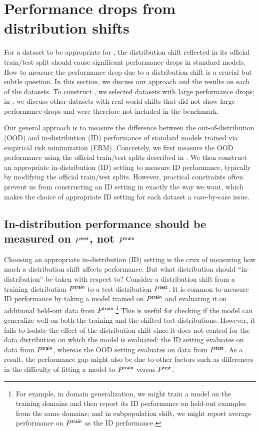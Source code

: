 \section{Performance drops from distribution shifts}\label{sec:erm_drops}

For a dataset to be appropriate for \Wilds, the distribution shift reflected in its official train/test split should cause significant performance drops in standard models.
How to measure the performance drop due to a distribution shift is a crucial but subtle question.
In this section, we discuss our approach and the results on each of the \Wilds datasets.
To construct \Wilds, we selected datasets with large performance drops;
in , we discuss other datasets with real-world shifts that did not show large performance drops and were therefore not included in the benchmark.

Our general approach is to measure the difference between the out-of-distribution (OOD) and in-distribution (ID) performance of standard models trained via empirical risk minimization (ERM).
Concretely, we first measure the OOD performance using the official train/test splits described in .
We then construct an appropriate in-distribution (ID) setting to measure ID performance, typically by modifying the official train/test splits.
However, practical constraints often prevent us from constructing an ID setting in exactly the way we want, which makes the choice of appropriate ID setting for each dataset a case-by-case issue.

\subsection{In-distribution performance should be measured on $P^\mathsf{test}$, not $P^\mathsf{train}$}
\label{sec:indist-control}
Choosing an appropriate in-distribution (ID) setting is the crux of measuring how much a distribution shift affects performance.
But what distribution should ``in-distribution'' be taken with respect to?
Consider a distribution shift from a training distribution $P^\mathsf{train}$ to a test distribution $P^\mathsf{test}$.
It is common to measure ID performance by taking a model trained on $P^\mathsf{train}$ and evaluating it on additional held-out data from $P^\mathsf{train}$.\footnote{For example, in domain generalization, we might train a model on the training domains and then report its ID performance on held-out examples from the same domains; and in subpopulation shift, we might report average performance on $P^\mathsf{train}$ as the ID performance.}
This is useful for checking if the model can generalize well on both the training and the shifted test distributions.
However, it fails to isolate the effect of the distribution shift since it does not control for the data distribution on which the model is evaluated: the ID setting evaluates on data from $P^\mathsf{train}$, whereas the OOD setting evaluates on data from $P^\mathsf{test}$.
As a result, the performance gap might also be due to other factors such as differences in the difficulty of fitting a model to $P^\mathsf{train}$ versus $P^\mathsf{test}$.

